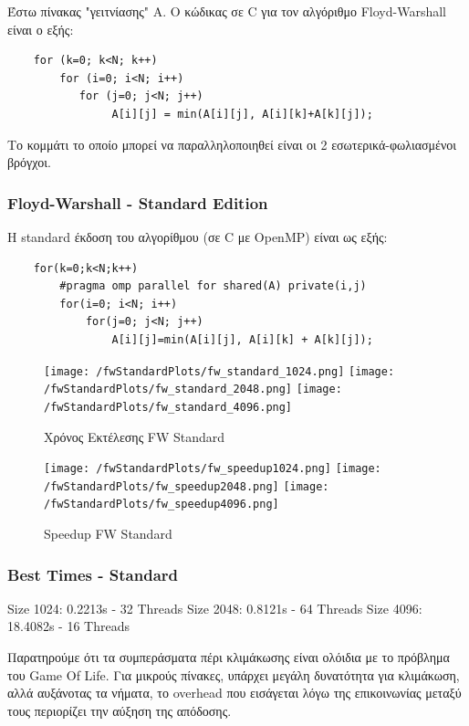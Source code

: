 \documentclass[letterpaper,12pt]{article}
\begin{document}
Έστω πίνακας "γειτνίασης" Α. Ο κώδικας σε C για τον αλγόριθμο Floyd-Warshall είναι ο εξής:

\begin{lstlisting}
    for (k=0; k<N; k++)
        for (i=0; i<N; i++)
           for (j=0; j<N; j++)
                A[i][j] = min(A[i][j], A[i][k]+A[k][j]);
\end{lstlisting}

Το κομμάτι το οποίο μπορεί να παραλληλοποιηθεί είναι οι 2 εσωτερικά-φωλιασμένοι βρόγχοι.

\subsubsection{Floyd-Warshall - Standard Edition}
Η standard έκδοση του αλγορίθμου (σε C με OpenMP) είναι ως εξής:

\begin{lstlisting}
    for(k=0;k<N;k++)
        #pragma omp parallel for shared(A) private(i,j)
        for(i=0; i<N; i++)
            for(j=0; j<N; j++)
                A[i][j]=min(A[i][j], A[i][k] + A[k][j]);
\end{lstlisting}

\begin{figure}[H]
    \centering
    \texttt{[image: /fwStandardPlots/fw\_standard\_1024.png]}
    \texttt{[image: /fwStandardPlots/fw\_standard\_2048.png]}
    \texttt{[image: /fwStandardPlots/fw\_standard\_4096.png]}
    \caption{Χρόνος Εκτέλεσης FW Standard}
    \label{fig:Χρόνος Εκτέλεσης FW Standard}
\end{figure}

\begin{figure}[H]
    \centering
    \texttt{[image: /fwStandardPlots/fw\_speedup1024.png]}
    \texttt{[image: /fwStandardPlots/fw\_speedup2048.png]}
    \texttt{[image: /fwStandardPlots/fw\_speedup4096.png]}
    \caption{Speedup FW Standard}
    \label{fig:Speedup FW Standard}
\end{figure}

\subsubsection*{Best Times - Standard}
Size 1024: 0.2213s - 32 Threads
\newline
Size 2048: 0.8121s - 64 Threads
\newline
Size 4096: 18.4082s - 16 Threads
\newline

Παρατηρούμε ότι τα συμπεράσματα πέρι κλιμάκωσης είναι ολόιδια με το πρόβλημα του Game Of Life.
Για μικρούς πίνακες, υπάρχει μεγάλη δυνατότητα για κλιμάκωση, αλλά αυξάνοτας τα νήματα, το overhead
που εισάγεται λόγω της επικοινωνίας μεταξύ τους περιορίζει την αύξηση της απόδοσης.
\end{document}
